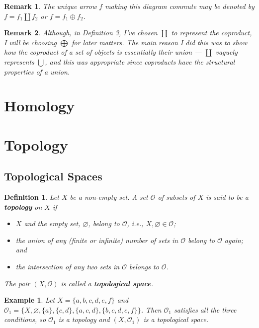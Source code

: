 \documentclass[12pt,reqno]{amsart}
\theoremstyle{plain}
\newtheorem{defi}{Definition}
\newtheorem{rem}{Remark}
\newtheorem{ex}{Example}
\begin{document}
\begin{rem} The unique arrow $f$ making this diagram commute may be denoted by $f = f_1 \coprod f_2$ or $f = f_1 \oplus f_2$. 
\end{rem} 
\begin{rem} Although, in Definition 3, I've chosen $\coprod$ to represent the coproduct, I will be choosing $\bigoplus$ for later matters. The main reason I did this was to show how the coproduct of a set of objects is essentially their union — $\coprod$ vaguely represents $\bigcup$, and this was appropriate since coproducts have the structural properties of a union.
\end{rem} 

\section{Homology}
\newpage 
\section{Topology}
\subsection{Topological Spaces}
\begin{defi} Let $X$ be a non-empty set. A set $\mathcal{O}$ of subsets of $X$ is said to be a \textup{\textbf{topology}} on $X$ if 
\begin{itemize}
	\item [\textup{(i)}] $X$ and the empty set, $\varnothing$, belong to $\mathcal{O}$, i.e., $X,\varnothing \in \mathcal{O}$; 
	\item [\textup{(ii)}] the union of any (finite or infinite) number of sets in $\mathcal{O}$ belong to $\mathcal{O}$ again; and
	\item [\textup{(iii)}] the intersection of any two sets in $\mathcal{O}$ belongs to $\mathcal{O}$.
\end{itemize}
The pair $(X, \mathcal{O})$ is called a \textup{\textbf{topological space}}. 
\end{defi}
\begin{ex} Let $X = \{a, b, c, d, e, f \}$ and $\mathcal{O}_1 = \{ X, \varnothing, \{a \}, \{c,d \}, \{a, c, d \}, \{b, c, d, e, f \} \}$. Then $\mathcal{O}_1$ satisfies all the three conditions, so $\mathcal{O}_1$ is a topology and $(X, \mathcal{O}_1)$ is a topological space. 
\end{ex}
\end{document}
